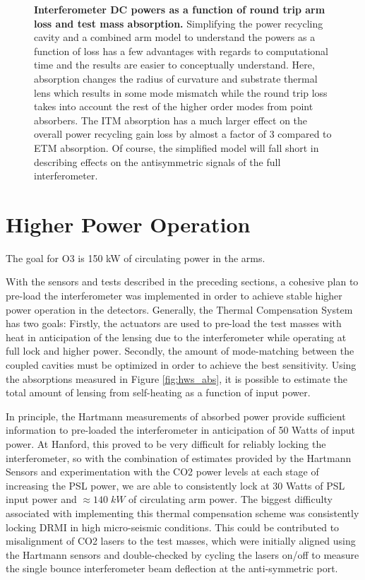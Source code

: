\begin{figure}
\begin{minipage}{0.5\textheight}
		\end{minipage}
		\caption[Interferometer DC powers as a function of round trip arm loss and test mass absorption.]  
		{\textbf{Interferometer DC powers as a function of round trip arm loss and test mass absorption.}
			Simplifying the power recycling cavity and a combined arm model to understand the powers as a function of loss has a few advantages with regards to computational time and the results are easier to conceptually understand.  Here, absorption changes the radius of curvature and substrate thermal lens which results in some mode mismatch while the round trip loss takes into account the rest of the higher order modes from point absorbers.  The ITM absorption has a much larger effect on the overall power recycling gain loss by almost a factor of 3 compared to ETM absorption.  Of course, the simplified model will fall short in describing effects on the antisymmetric signals of the full interferometer.
		}
		\label{fig:simple_prc_arm}
	\end{figure}

\section{Higher Power Operation}
	The goal for O3 is 150 kW of circulating power in the arms.
	
	With the sensors and tests described in the preceding sections, a cohesive plan to pre-load the interferometer was implemented in order to achieve stable higher power operation in the detectors.  Generally, the Thermal Compensation System has two goals: Firstly, the actuators are used to pre-load the test masses with heat in anticipation of the lensing due to the interferometer while operating at full lock and higher power.  Secondly, the amount of mode-matching between the coupled cavities must be optimized in order to achieve the best sensitivity.  Using the absorptions measured in Figure \ref{fig:hws_abs}, it is possible to estimate the total amount of lensing from self-heating as a function of input power.
	
	In principle, the Hartmann measurements of absorbed power provide sufficient information to pre-loaded the interferometer in anticipation of 50 Watts of input power. At Hanford, this proved to be very difficult for reliably locking the interferometer, so with the combination of estimates provided by the Hartmann Sensors and experimentation with the CO2 power levels at each stage of increasing the PSL power, we are able to consistently lock at 30 Watts of PSL input power and $\approx 140 \; kW$ of circulating arm power.  The biggest difficulty associated with implementing this thermal compensation scheme was consistently locking DRMI in high micro-seismic conditions. This could be contributed to misalignment of CO2 lasers to the test masses, which were initially aligned using the Hartmann sensors and double-checked by cycling the lasers on/off to measure the single bounce interferometer beam deflection at the anti-symmetric port.
	
